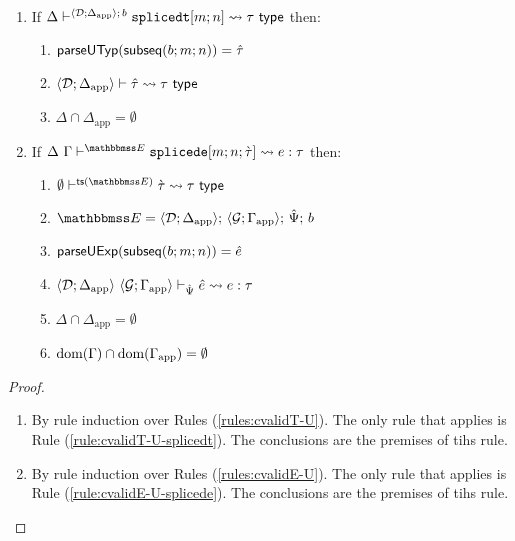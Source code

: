 \begin{theorem}
\label{thm:shadowing-prohibition-SES} ~
\begin{enumerate}
\item If $\Delta\vdash^{\langle \mathcal{D}; \Delta_\text{app} \rangle;\,b} \texttt{splicedt}[m; n] \leadsto \tau~\mathsf{type}$ then:\begin{enumerate}
\item $\mathsf{parseUTyp}(\mathsf{subseq}(b; m; n))={\hat\tau}$
\item $\langle \mathcal{D}; \Delta_\text{app} \rangle \vdash {\hat\tau} \leadsto \tau~\mathsf{type}$
\item $\Delta \cap \Delta_\text{app} = \emptyset$
\end{enumerate}
\item If $\cvalidE{\Delta}{\Gamma}{\escenev}{\acesplicede{m}{n}{\ctau}}{e}{\tau}$ then:
\begin{enumerate}
\item $\cvalidT{\emptyset}{\tsfrom{\escenev}}{\ctau}{\tau}$
\item $  \escenev=\esceneU{\uDD{\uD}{\Delta_\text{app}}}{\uGG{\uG}{\Gamma_\text{app}}}{\uPsi}{b}$
\item $\mathsf{parseUExp}(\mathsf{subseq}(b; m; n))={\hat e}$
\item $\langle \mathcal{D}; \Delta_\text{app} \rangle~\langle \mathcal{G}; \Gamma_\text{app} \rangle \vdash_{\hat{\Psi}} {\hat e} \leadsto e : \tau$
\item $\Delta \cap \Delta_\text{app} = \emptyset$
\item $\text{dom}(\Gamma) \cap \text{dom}(\Gamma_\text{app}) = \emptyset$
\end{enumerate}
\end{enumerate}
\end{theorem}
\begin{proof} ~
\begin{enumerate}
\item By rule induction over Rules (\ref{rules:cvalidT-U}). The only rule that applies is Rule (\ref{rule:cvalidT-U-splicedt}). The conclusions are the premises of tihs rule.
\item By rule induction over Rules (\ref{rules:cvalidE-U}). The only rule that applies is Rule (\ref{rule:cvalidE-U-splicede}). The conclusions are the premises of tihs rule.
\end{enumerate}
\end{proof}

